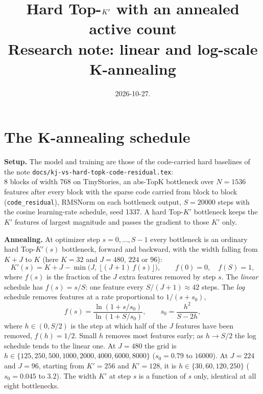 \documentclass[11pt,a4paper]{article}
\title{Hard Top-$\Kp$ with an annealed active count\\[2pt]
\large Research note: linear and log-scale K-annealing}
\author{}
\date{2026-10-27.}
\newcommand{\code}[1]{\texttt{#1}}
\newcommand{\Kp}{K'}
\begin{document}
\maketitle
\vspace{-2em}

\section*{The K-annealing schedule}

\textbf{Setup.} The model and training are those of the code-carried hard
baselines of the note \code{docs/kj-vs-hard-topk-code-residual.tex}:\\ 8 blocks of width
768 on TinyStories, an abs-TopK bottleneck over $N = 1536$ features after
every block with the sparse code carried from block to block
(\code{code\_residual}), RMSNorm on each bottleneck output, $S = 20000$ steps
with the cosine learning-rate schedule, seed 1337. A hard Top-$\Kp$
bottleneck keeps the $\Kp$ features of largest magnitude and passes the
gradient to those $\Kp$ only.

\textbf{Annealing.} At optimizer step $s = 0, \dots, S-1$ every bottleneck is
an ordinary hard Top-$\Kp(s)$ bottleneck, forward and backward, with the
width falling from $K + J$ to $K$ (here $K = 32$ and $J = 480$, $224$ or $96$):
\begin{equation*}
\Kp(s) = K + J - \min\bigl(J,\ \lfloor (J+1)\, f(s) \rfloor\bigr),
\qquad f(0) = 0,\quad f(S) = 1,
\end{equation*}
where $f(s)$ is the fraction of the $J$ extra features removed by step $s$.
The \emph{linear} schedule has $f(s) = s/S$: one feature every
$S/(J+1) \approx 42$ steps. The \emph{log} schedule removes features at a rate
proportional to $1/(s + s_0)$,
\begin{equation*}
f(s) = \frac{\ln(1 + s/s_0)}{\ln(1 + S/s_0)},
\qquad s_0 = \frac{h^2}{S - 2h},
\end{equation*}
where $h \in (0, S/2)$ is the step at which half of the $J$ features have
been removed, $f(h) = 1/2$. Small $h$ removes most features early; as
$h \to S/2$ the log schedule tends to the linear one. At $J = 480$ the grid is
$h \in \{125, 250, 500, 1000, 2000, 4000, 6000, 8000\}$
($s_0 = 0.79$ to $16000$). At $J = 224$ and $J = 96$, starting from
$\Kp = 256$ and $\Kp = 128$, it is $h \in \{30, 60, 120, 250\}$
($s_0 = 0.045$ to $3.2$). The width $\Kp$ at step $s$ is a function of $s$
only, identical at all eight bottlenecks.
\end{document}
